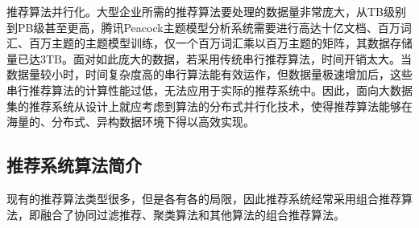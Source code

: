	推荐算法并行化。大型企业所需的推荐算法要处理的数据量非常庞大，从TB级别到PB级甚至更高，腾讯Peacock主题模型分析系统需要进行高达十亿文档、百万词汇、百万主题的主题模型训练，仅一个百万词汇乘以百万主题的矩阵，其数据存储量已达3TB。面对如此庞大的数据，若采用传统串行推荐算法，时间开销太大。当数据量较小时，时间复杂度高的串行算法能有效运作，但数据量极速增加后，这些串行推荐算法的计算性能过低，无法应用于实际的推荐系统中。因此，面向大数据集的推荐系统从设计上就应考虑到算法的分布式并行化技术，使得推荐算法能够在海量的、分布式、异构数据环境下得以高效实现。

	\subsection{推荐系统算法简介}
	现有的推荐算法类型很多，但是各有各的局限，因此推荐系统经常采用组合推荐算法，即融合了协同过滤推荐、聚类算法和其他算法的组合推荐算法。
